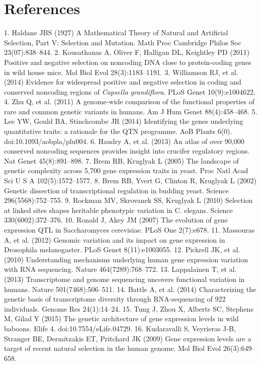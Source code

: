 \section{References}
1. 	Haldane JBS (1927) A Mathematical Theory of Natural and Artificial Selection, Part V: Selection and Mutation. Math Proc Cambridge Philos Soc 23(07):838–844.
2. 	Kousathanas A, Oliver F, Halligan DL, Keightley PD (2011) Positive and negative selection on noncoding DNA close to protein-coding genes in wild house mice. Mol Biol Evol 28(3):1183–1191.
3. 	Williamson RJ, et al. (2014) Evidence for widespread positive and negative selection in coding and conserved noncoding regions of \textit{Capsella grandiflora}. PLoS Genet 10(9):e1004622.
4. 	Zhu Q, et al. (2011) A genome-wide comparison of the functional properties of rare and common genetic variants in humans. Am J Hum Genet 88(4):458–468.
5. 	Lee YW, Gould BA, Stinchcombe JR (2014) Identifying the genes underlying quantitative traits: a rationale for the QTN programme. AoB Plants 6(0). doi:10.1093/aobpla/plu004.
6. 	Haudry A, et al. (2013) An atlas of over 90,000 conserved noncoding sequences provides insight into crucifer regulatory regions. Nat Genet 45(8):891–898.
7. 	Brem RB, Kruglyak L (2005) The landscape of genetic complexity across 5,700 gene expression traits in yeast. Proc Natl Acad Sci U S A 102(5):1572–1577.
8. 	Brem RB, Yvert G, Clinton R, Kruglyak L (2002) Genetic dissection of transcriptional regulation in budding yeast. Science 296(5568):752–755.
9. 	Rockman MV, Skrovanek SS, Kruglyak L (2010) Selection at linked sites shapes heritable phenotypic variation in C. elegans. Science 330(6002):372–376.
10. 	Ronald J, Akey JM (2007) The evolution of gene expression QTL in Saccharomyces cerevisiae. PLoS One 2(7):e678.
11. 	Massouras A, et al. (2012) Genomic variation and its impact on gene expression in Drosophila melanogaster. PLoS Genet 8(11):e1003055.
12. 	Pickrell JK, et al. (2010) Understanding mechanisms underlying human gene expression variation with RNA sequencing. Nature 464(7289):768–772.
13. 	Lappalainen T, et al. (2013) Transcriptome and genome sequencing uncovers functional variation in humans. Nature 501(7468):506–511.
14. 	Battle A, et al. (2014) Characterizing the genetic basis of transcriptome diversity through RNA-sequencing of 922 individuals. Genome Res 24(1):14–24.
15. 	Tung J, Zhou X, Alberts SC, Stephens M, Gilad Y (2015) The genetic architecture of gene expression levels in wild baboons. Elife 4. doi:10.7554/eLife.04729.
16. 	Kudaravalli S, Veyrieras J-B, Stranger BE, Dermitzakis ET, Pritchard JK (2009) Gene expression levels are a target of recent natural selection in the human genome. Mol Biol Evol 26(3):649–658.
